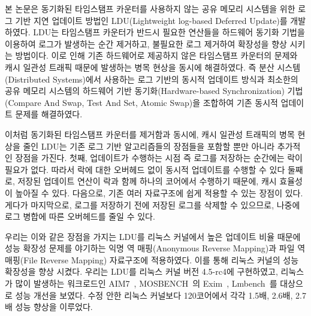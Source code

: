 %
본 논문은 동기화된 타임스탬프 카운터를 사용하지 않는 공유 메모리 시스템을 위한 
로그 기반 지연 업데이트 방법인 LDU(Lightweight log-based Deferred Update)를 개발하였다.
LDU는 타임스탬프 카운터가 반드시 필요한 연산들을 하드웨어 동기화 기법을 이용하여 
로그가 발생하는 순간 제거하고, 불필요한 로그 제거하여 확장성을 향상 시키는 방법이다.
이로 인해 기존 하드웨어로 제공하지 않은 타임스탬프 카운터의 문제와 
캐시 일관성 트래픽 때문에 발생하는 병목 현상을 동시에 해결하였다.
즉 분산 시스템(Distributed Systems)에서 사용하는 로그 기반의 
동시적 업데이트 방식과 최소한의 공유 메모리 시스템의 하드웨어 기반 동기화(Hardware-based
Synchronization) 기법(Compare And Swap, Test And Set, Atomic Swap)을 조합하여 기존 동시적
업데이트 문제를 해결하였다.

이처럼 동기화된 타임스탬프 카운터를 제거함과 동시에, 캐시 일관성 트래픽의 병목 현상을 줄인
LDU는 기존 로그 기반 알고리즘들의 장점들을 포함할 뿐만 아니라 추가적인 장점을 가진다.
첫째, 업데이트가 수행하는 시점 즉 로그를 저장하는 순간에는 락이 필요가 없다.
따라서 락에 대한 오버헤드 없이 동시적 업데이트를 수행할 수 있다
둘째로, 저장된 업데이트 연산이 락과 함께 하나의 코어에서 수행하기 때문에, 
캐시 효율성이 높아질 수 있다\cite{Hendler2010FC}.
다음으로, 기존 여러 자료구조에 쉽게 적용할 수 있는 장점이 있다.
게다가 마지막으로, 로그를 저장하기 전에 저장된 로그를 삭제할 수 있으므로, 나중에 로그 병합에 
따른 오버헤드를 줄일 수 있다. 

우리는 이와 같은 장점을 가지는 LDU를 리눅스 커널에서 높은 업데이트 비율 때문에 성능 확장성 
문제를 야기하는 익명 역 매핑(Anonymous Reverse Mapping)과 파일 역 매핑(File Reverse Mapping) 자료구조에
적용하였다. 이를 통해 리눅스 커널의 성능 확장성을 향상 시켰다.
우리는 LDU를 리눅스 커널 버전 4.5-rc4에 구현하였고, 리눅스 가 많이 발생하는 워크로드인
AIM7~\cite{AIM7Benchmark}, MOSBENCH~\cite{MOSBENCH}의 Exim~\cite{Exim}, Lmbench~\cite{mcvoy1996lmbench}를 
대상으로 성능 개선을 보였다. 
수정 안한 리눅스 커널보다 120코어에서 각각 1.5배, 2.6배, 2.7배 성능 향상을 이루었다.

